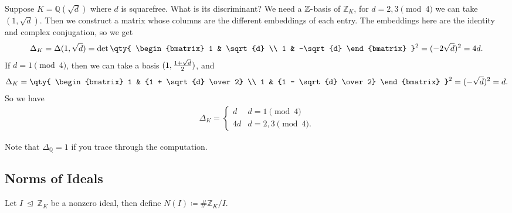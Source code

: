 \begin{example}[of a discriminant]

Suppose \(K = {\mathbb{Q}}( \sqrt{d} )\) where \(d\) is squarefree. What
is its discriminant? We need a \({\mathbb{Z}}{\hbox{-}}\)basis of
\({\mathbb{Z}}_K\), for \(d=2,3 \pmod 4\) we can take
\((1, \sqrt{d} )\). Then we construct a matrix whose columns are the
different embeddings of each entry. The embeddings here are the identity
and complex conjugation, so we get
\begin{align*}
\Delta_K = \Delta(1, \sqrt{ d} )
= 
\det 
\qty{
\begin{bmatrix}
1 & \sqrt{d} 
\\
 1 & -\sqrt{d} 
\end{bmatrix}
}^2
= (-2 \sqrt{d} )^2 = 4d
.\end{align*}
If \(d = 1 \pmod 4\), then we can take a basis
\((1, {1 + \sqrt{d} \over 2})\), and
\begin{align*}
\Delta_{K}
=
\qty{
\begin{bmatrix}
1 & {1 + \sqrt{d} \over 2}
\\
1 & {1 - \sqrt{d} \over 2}
\end{bmatrix}
}^2
= (- \sqrt{d} )^2 = d
.\end{align*}
So we have
\begin{align*}
\Delta_K = 
\begin{cases}
d & d = 1 \pmod 4 
\\
4d & d = 2,3 \pmod 4 .
\end{cases}
\end{align*}

\end{example}

\begin{remark}

Note that \(\Delta_{\mathbb{Q}}= 1\) if you trace through the
computation.

\end{remark}

\hypertarget{norms-of-ideals}{%
\subsection{Norms of Ideals}\label{norms-of-ideals}}

\begin{definition}

Let \(I {~\trianglelefteq~}{\mathbb{Z}}_K\) be a nonzero ideal, then
define \(N(I) \coloneqq\# {\mathbb{Z}}_K/I\).

\end{definition}

